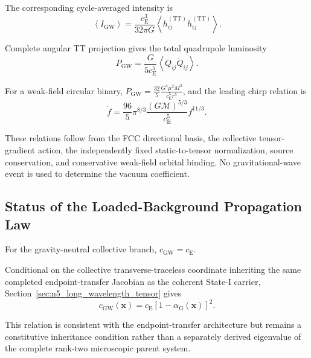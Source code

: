 The corresponding cycle-averaged intensity is
\begin{equation}
    \left\langle I_{\mathrm{GW}} \right\rangle = \frac{ c_{\mathrm{E}}^{3} }{ 32\pi G } \left\langle \dot{h}_{ij}^{(\mathrm{TT})} \dot{h}_{ij}^{(\mathrm{TT})} \right\rangle.
\end{equation}

Complete angular TT projection gives the total quadrupole luminosity
\begin{equation}
    P_{\mathrm{GW}} = \frac{ G }{ 5c_{\mathrm{E}}^{5} } \left\langle \dddot{Q}_{ij} \dddot{Q}_{ij} \right\rangle.
    \label{eq:n12_quadrupole_power}
\end{equation}

For a weak-field circular binary, $P_{\mathrm{GW}} = \frac{32}{5} \frac{ G^{4}\mu^{2}M^{3} }{ c_{\mathrm{E}}^{5}r^{5} }$, and the leading chirp relation is
\begin{equation}
    \dot{f} = \frac{96}{5} \pi^{8/3} \frac{ \left( G\mathcal{M} \right)^{5/3} }{ c_{\mathrm{E}}^{5} } f^{11/3}.
    \label{eq:n12_chirp_relation}
\end{equation}

These relations follow from the FCC directional basis, the collective tensor-gradient action, the independently fixed static-to-tensor normalization, source conservation, and conservative weak-field orbital binding. No gravitational-wave event is used to determine the vacuum coefficient.

\subsection{Status of the Loaded-Background Propagation Law}
\label{subsec:n12_loaded_background_status}

For the gravity-neutral collective branch, $c_{\mathrm{GW}} = c_{\mathrm{E}}$.

Conditional on the collective transverse-traceless coordinate inheriting the same completed endpoint-transfer Jacobian as the coherent State-I carrier, Section~\ref{sec:n5_long_wavelength_tensor} gives
\begin{equation}
    c_{\mathrm{GW}}(\mathbf{x}) = c_{\mathrm{E}} \left[ 1-\alpha_{\mathrm{G}}(\mathbf{x}) \right]^{2}.
    \label{eq:n12_loaded_gw_speed}
\end{equation}

This relation is consistent with the endpoint-transfer architecture but remains a constitutive inheritance condition rather than a separately derived eigenvalue of the complete rank-two microscopic parent system.

